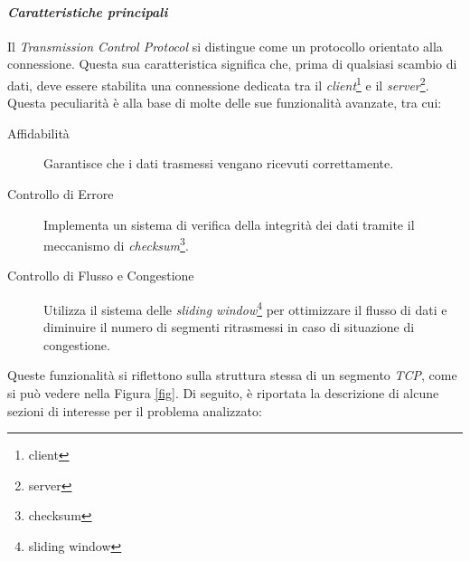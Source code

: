 \paragraph{\textit{Caratteristiche principali}}
\noindent Il \emph{Transmission Control Protocol} si distingue come un protocollo orientato alla connessione. Questa sua caratteristica significa che, prima di qualsiasi scambio di dati, deve essere stabilita una connessione dedicata tra il \emph{client}\footnote{\gls{client}} e il \emph{server}\footnote{\gls{server}}.
Questa peculiarità è alla base di molte delle sue funzionalità avanzate, tra cui:
\begin{description}
    \item[Affidabilità] Garantisce che i dati trasmessi vengano ricevuti correttamente.

    \item[Controllo di Errore] Implementa un sistema di verifica della integrità dei dati tramite il meccanismo di \emph{checksum}\footnote{\gls{checksum}}.
    
    \item[Controllo di Flusso e Congestione] Utilizza il sistema delle \emph{sliding window}\footnote{\gls{sliding window}} per ottimizzare il flusso di dati e diminuire il numero di segmenti ritrasmessi in caso di situazione di congestione.
\end{description}

\noindent Queste funzionalità si riflettono sulla struttura stessa di un segmento \emph{TCP}, come si può vedere nella Figura \ref{fig}. 
Di seguito, è riportata la descrizione di alcune sezioni di interesse per il problema analizzato:

